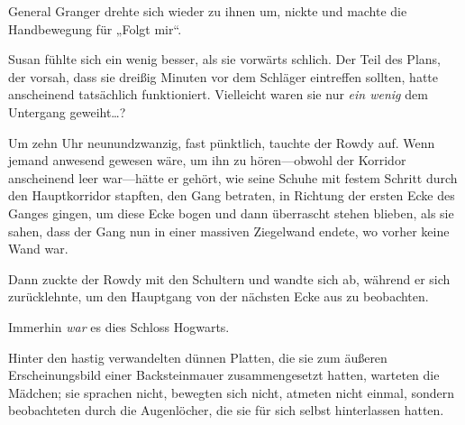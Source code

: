 General Granger drehte sich wieder zu ihnen um, nickte und machte die Handbewegung für „Folgt mir“.

Susan fühlte sich ein wenig besser, als sie vorwärts schlich. Der Teil des Plans, der vorsah, dass sie dreißig Minuten vor dem Schläger eintreffen sollten, hatte anscheinend tatsächlich funktioniert. Vielleicht waren sie nur \emph{ein wenig} dem Untergang geweiht…?

\later

Um zehn Uhr neunundzwanzig, fast pünktlich, tauchte der Rowdy auf. Wenn jemand anwesend gewesen wäre, um ihn zu hören—obwohl der Korridor anscheinend leer war—hätte er gehört, wie seine Schuhe mit festem Schritt durch den Hauptkorridor stapften, den Gang betraten, in Richtung der ersten Ecke des Ganges gingen, um diese Ecke bogen und dann überrascht stehen blieben, als sie sahen, dass der Gang nun in einer massiven Ziegelwand endete, wo vorher keine Wand war.

Dann zuckte der Rowdy mit den Schultern und wandte sich ab, während er sich zurücklehnte, um den Hauptgang von der nächsten Ecke aus zu beobachten.

Immerhin \emph{war} es dies Schloss Hogwarts.

Hinter den hastig verwandelten dünnen Platten, die sie zum äußeren Erscheinungsbild einer Backsteinmauer zusammengesetzt hatten, warteten die Mädchen; sie sprachen nicht, bewegten sich nicht, atmeten nicht einmal, sondern beobachteten durch die Augenlöcher, die sie für sich selbst hinterlassen hatten.

